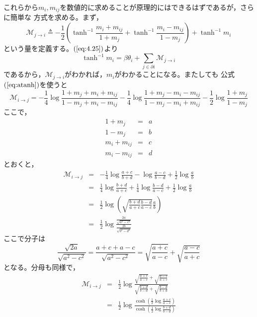 これらから$m_{i},m_{ij}$を数値的に求めることが原理的にはできるはずであるが，さらに簡単な
方式を求める。まず，
\begin{equation}
\mathcal{M}_{j\rightarrow i}\triangleq-\frac{1}{2}
\left(\tanh^{-1}\frac{m_{i}+m_{ij}}{1+m_{j}}+\tanh^{-1}\frac{m_{i}-m_{ij}}{1-m_{j}}
\right)+\tanh^{-1}m_{i}\label{eq:4.32}
\end{equation}
という量を定義する。$(\ref{eq:4.25})$より
\begin{equation}
\tanh^{-1}m_{i}=\beta\theta_{i}+\sum_{j\in\partial i}\mathcal{M}_{j\rightarrow
i}
\label{eq:4.31}
\end{equation}
であるから，$\mathcal{M}_{j\rightarrow i}$がわかれば，$m_{i}$がわかることになる。またしても
公式$(\ref{eq:atanh})$を使うと
\begin{equation}
\mathcal{M}_{i\rightarrow j}=-\frac{1}{4}\log
\frac{1+m_{j}+m_{i}+m_{ij}}{1-m_{j}+m_{i}-m_{ij}}
-\frac{1}{4}\log\frac{1+m_{j}-m_{i}-m_{ij}}{1-m_{j}-m_{i}+m_{ij}}
-\frac{1}{2}\log\frac{1+m_{j}}{1-m_{j}}\nonumber
\end{equation}
ここで，
\begin{eqnarray}
1+m_{j}&=&a\nonumber\\
1-m_{j}&=&b\nonumber\\
m_{i}+m_{ij}&=&c\nonumber\\
m_{i}-m_{ij}&=&d\nonumber
\end{eqnarray}
とおくと，
\begin{eqnarray}
\mathcal{M}_{i\rightarrow
j}&=&-\frac{1}{4}\log\frac{a+c}{b+d}-\log\frac{a-c}{b-d}+\frac{1}{2}\log\frac{a}{b}
\nonumber\\
&=&\frac{1}{4}\log\frac{b+d}{a+c}+\frac{1}{4}\log\frac{b-d}{a-c}+\frac{1}{2}\log\frac{a}{b}
\nonumber\\
&=&\frac{1}{2}\log\left(\sqrt{\frac{b+d}{a+c}\frac{b-d}{a-c}}\frac{a}{b}\right)\nonumber\\
&=&\frac{1}{2}\log\frac{\displaystyle\frac{2a}{\sqrt{a^{2}-c^{2}}}}
{\displaystyle\frac{2b}{\sqrt{b^{2}-d^{2}}}}\nonumber
\end{eqnarray}
ここで分子は
\begin{equation}
\frac{\sqrt{2a}}{\sqrt{a^{2}-c^{2}}}=\frac{a+c+a-c}{\sqrt{a^{2}-c^{2}}}
=\sqrt{\frac{a+c}{a-c}}+\sqrt{\frac{a-c}{a+c}}\nonumber
\end{equation}
となる。分母も同様で，
\begin{eqnarray}
\mathcal{M}_{i\rightarrow j}&=&\frac{1}{2}\log
\frac{\displaystyle\sqrt{\frac{a+c}{a-c}}+\sqrt{\frac{a-c}{a+c}}}
{\displaystyle\sqrt{\frac{b+d}{b-d}}+\sqrt{\frac{b-d}{b+d}}}\nonumber\\
&=&\frac{1}{2}\log\frac{\displaystyle\cosh\left(\frac{1}{2}\log\frac{a+c}{a-c}\right)}
{\displaystyle\cosh\left(\frac{1}{2}\log\frac{b+d}{b-d}\right)}\nonumber
\end{eqnarray}
